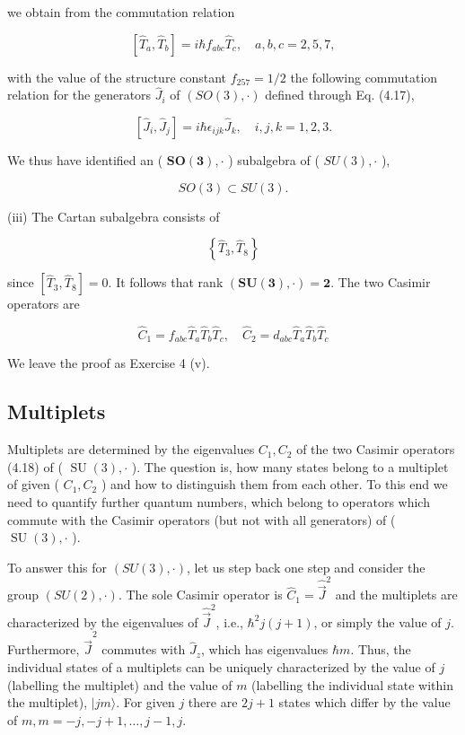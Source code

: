 \documentclass[10pt, letterpaper]{article}
\begin{document}
we obtain from the commutation relation

$$
\left[\hat{T}_{a}, \hat{T}_{b}\right]=i \hbar f_{a b c} \hat{T}_{c}, \quad a, b, c=2,5,7,
$$

with the value of the structure constant $f_{257}=1 / 2$ the following commutation relation for the generators $\hat{J}_{i}$ of $(S O(3), \cdot)$ defined through Eq. (4.17),

$$
\left[\hat{J}_{i}, \hat{J}_{j}\right]=i \hbar \epsilon_{i j k} \hat{J}_{k}, \quad i, j, k=1,2,3 .
$$

We thus have identified an ( $\boldsymbol{S O}(\mathbf{3}), \cdot$ ) subalgebra of ( $S U(3), \cdot$ ),

$$
S O(3) \subset S U(3) .
$$

(iii) The Cartan subalgebra consists of

$$
\left\{\hat{T}_{3}, \hat{T}_{8}\right\}
$$

since $\left[\hat{T}_{3}, \hat{T}_{8}\right]=0$. It follows that rank $(\boldsymbol{S U}(\mathbf{3}), \cdot)=\mathbf{2}$. The two Casimir operators are

$$
\hat{C}_{1}=f_{a b c} \hat{T}_{a} \hat{T}_{b} \hat{T}_{c}, \quad \hat{C}_{2}=d_{a b c} \hat{T}_{a} \hat{T}_{b} \hat{T}_{c}
$$

We leave the proof as Exercise 4 (v).

\subsection{Multiplets}
Multiplets are determined by the eigenvalues $C_{1}, C_{2}$ of the two Casimir operators (4.18) of ( $\operatorname{SU}(3), \cdot$ ). The question is, how many states belong to a multiplet of given ( $C_{1}, C_{2}$ ) and how to distinguish them from each other. To this end we need to quantify further quantum numbers, which belong to operators which commute with the Casimir operators (but not with all generators) of ( $\operatorname{SU}(3), \cdot$ ).

To answer this for $(S U(3), \cdot)$, let us step back one step and consider the group $(S U(2), \cdot)$. The sole Casimir operator is $\hat{C}_{1}=\hat{\vec{J}}^{2}$ and the multiplets are characterized by the eigenvalues of $\hat{\vec{J}}^{2}$, i.e., $\hbar^{2} j(j+1)$, or simply the value of $j$. Furthermore, $\hat{\vec{J}}^{2}$ commutes with $\hat{J}_{z}$, which has eigenvalues $\hbar m$. Thus, the individual states of a multiplets can be uniquely characterized by the value of $j$ (labelling the multiplet) and the value of $m$ (labelling the individual state within the multiplet), $|j m\rangle$. For given $j$ there are $2 j+1$ states which differ by the value of $m, m=-j,-j+1, \ldots, j-1, j$.
\end{document}
